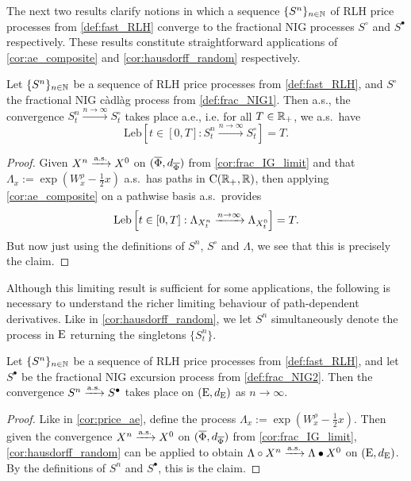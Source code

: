 The next two results clarify notions in which a sequence $\{S^n\}_{n\in\mathbb{N}}$ of RLH price processes from \autoref{def:fast_RLH} converge to the fractional NIG processes $S^\circ$ and $S^\bullet$ respectively. These results constitute straightforward applications of \autoref{cor:ae_composite} and \autoref{cor:hausdorff_random} respectively.

\begin{corollary}\label{cor:price_ae}
    Let $\{S^n\}_{n\in\mathbb{N}}$ be a sequence of RLH price processes from \autoref{def:fast_RLH}, and $S^\circ$ the fractional NIG c\`adl\`ag process from \autoref{def:frac_NIG1}. Then a.s., the convergence $S^n_t\xrightarrow{n\to\infty}S^\circ_t$ takes place a.e., i.e. for all $T\in\mathbb{R}_+$, we a.s.~have
    \begin{equation}
        \mathrm{Leb}\left[t\in[0,T]: S^n_t\xrightarrow{n\to\infty}S^\circ_t\right]=T.
    \end{equation}
\end{corollary}
\begin{proof}
    Given $X^n\xrightarrow{\mathrm{a.s.}} X^0$ on $(\overline{\Phi},d_{\overline{\Phi}})$ from \autoref{cor:frac_IG_limit} and that $\Lambda_x:=\exp(W^\rho_x-\frac12 x)$ a.s.~has paths in $\mathrm{C}(\mathbb{R}_+,\mathbb{R})$, then applying \autoref{cor:ae_composite} on a pathwise basis a.s.~provides
    \begin{equation}
        \operatorname*{Leb}\left[t\in[0,T]:\Lambda_{X^n_t}\xrightarrow{n\to\infty}\Lambda_{X^0_t}\right]=T.
    \end{equation}
    But now just using the definitions of $S^n$, $S^\circ$ and $\Lambda$, we see that this is precisely the claim.
\end{proof}

Although this limiting result is sufficient for some applications, the following is necessary to understand the richer limiting behaviour of path-dependent derivatives. Like in \autoref{cor:hausdorff_random}, we let $S^n$ simultaneously denote the process in $\mathrm{E}$ returning the singletons $\{S^n_t\}$.

\begin{corollary}\label{cor:price_hausdorff}
    Let $\{S^n\}_{n\in\mathbb{N}}$ be a sequence of RLH price processes from \autoref{def:fast_RLH}, and let $S^\bullet$ be the fractional NIG excursion process from \autoref{def:frac_NIG2}. Then the convergence $S^n\xrightarrow{\mathrm{a.s.}} S^\bullet$ takes place on $(\mathrm{E},d_{\mathrm{E}})$ as $n\to\infty$.
\end{corollary}
\begin{proof}
    Like in \autoref{cor:price_ae}, define the process $\Lambda_x:=\exp(W^\rho_x - \frac12x)$. Then given the convergence $X^n \xrightarrow{\mathrm{a.s.}} X^0$ on $(\overline{\Phi},d_{\overline{\Phi}})$ from \autoref{cor:frac_IG_limit}, \autoref{cor:hausdorff_random} can be applied to obtain $\Lambda\circ X^n \xrightarrow{\mathrm{a.s.}} \Lambda\bullet X^0$ on $(\mathrm{E},d_{\mathrm{E}})$. By the definitions of $S^n$ and $S^\bullet$, this is the claim.
\end{proof}

